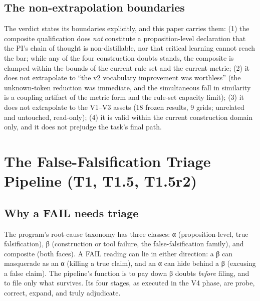 \documentclass[11pt]{article}
\begin{document}
\subsection{The non-extrapolation boundaries}
\noindent The verdict states its boundaries explicitly, and this paper carries them: (1) the composite qualification does \emph{not} constitute a proposition-level declaration that the PI's chain of thought is non-distillable, nor that critical learning cannot reach the bar; while any of the four construction doubts stands, the composite is clamped within the bounds of the current rule set and the current metric; (2) it does not extrapolate to ``the v2 vocabulary improvement was worthless'' (the unknown-token reduction was immediate, and the simultaneous fall in similarity is a coupling artifact of the metric form and the rule-set capacity limit); (3) it does not extrapolate to the V1–V3 assets (18 frozen results, 9 grids; unrelated and untouched, read-only); (4) it is valid within the current construction domain only, and it does not prejudge the task's final path.\par
\section{The False-Falsification Triage Pipeline (T1, T1.5, T1.5r2)}
\label{sec:13}
\subsection{Why a FAIL needs triage}
\noindent The program's root-cause taxonomy has three classes: α (proposition-level, true falsification), β (construction or tool failure, the false-falsification family), and composite (both faces). A FAIL reading can lie in either direction: a β can masquerade as an α (killing a true claim), and an α can hide behind a β (excusing a false claim). The pipeline's function is to pay down β doubts \emph{before} filing, and to file only what survives. Its four stages, as executed in the V4 phase, are probe, correct, expand, and truly adjudicate.\par
\end{document}
